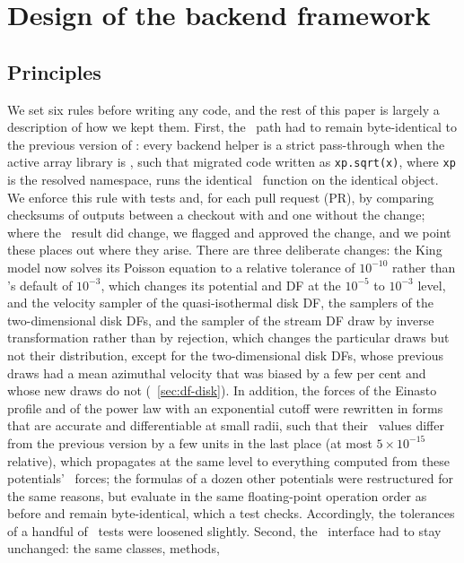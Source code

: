 \section{Design of the backend framework}\label{sec:design}

\subsection{Principles}\label{sec:design-principles}

We set six rules before writing any code, and the rest of this paper
is largely a description of how we kept them. First, the \numpy\ path had to remain
byte-identical to the previous version of \galpy: every backend helper is
a strict pass-through when the active array library is \numpy, such that
migrated code written as \texttt{xp.sqrt(x)}, where \texttt{xp} is the
resolved namespace, runs the identical \numpy\ function on the identical
object. We enforce this rule with tests and, for each pull request (PR), by comparing
checksums of outputs between a checkout with and one without the change;
where the \numpy\ result did change, we flagged and approved the
change, and we point these places out where they arise. There are
three deliberate changes: the King model now solves its Poisson
equation to a relative tolerance of $10^{-10}$ rather than \scipy's
default of $10^{-3}$, which changes its potential and DF at the
$10^{-5}$ to $10^{-3}$ level, and the velocity sampler of the
quasi-isothermal disk DF, the samplers of the two-dimensional disk DFs,
and the sampler of the stream DF draw by inverse transformation rather
than by rejection, which changes the particular draws but not their
distribution, except for the two-dimensional disk DFs, whose previous
draws had a mean azimuthal velocity that was biased by a few per cent
and whose new draws do not (\sectionname~\ref{sec:df-disk}). In addition, the forces of the Einasto profile and of
the power law with an exponential cutoff were rewritten in forms that
are accurate and differentiable at small radii, such that their
\numpy\ values differ from the previous version by a few units in the
last place (at most $5\times10^{-15}$ relative), which propagates at
the same level to everything computed from these potentials' \python\
forces; the formulas of a dozen other potentials were restructured for
the same reasons, but evaluate in the same floating-point operation
order as before and remain byte-identical, which a test checks.
Accordingly, the tolerances of a handful of \numpy\ tests were
loosened slightly. Second, the \galpy\ interface had to stay unchanged: the same classes, methods,
